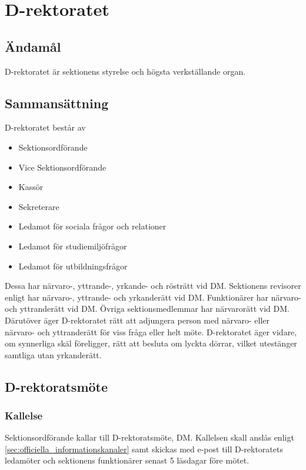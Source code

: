 \documentclass[a4paper,12pt]{article}
\begin{document}
\section{D-rektoratet}

\subsection{Ändamål}

D-rektoratet är sektionens styrelse och högsta verkställande organ.

\subsection{Sammansättning}

D-rektoratet består av

\begin{itemize}
  \item Sektionsordförande
  \item Vice Sektionsordförande
  \item Kassör
  \item Sekreterare
  \item Ledamot för sociala frågor och relationer
  \item Ledamot för studiemiljöfrågor
  \item Ledamot för utbildningsfrågor
\end{itemize}

Dessa har närvaro-, yttrande-, yrkande- och rösträtt vid DM. Sektionens revisorer enligt har närvaro-, yttrande- och yrkanderätt vid DM. Funktionärer har närvaro- och yttranderätt vid DM. Övriga sektionsmedlemmar har närvarorätt vid DM. Därutöver äger D-rektoratet rätt att adjungera person med närvaro- eller närvaro- och yttranderätt för viss fråga eller helt möte. D-rektoratet äger vidare, om synnerliga skäl föreligger, rätt att besluta om lyckta dörrar, vilket utestänger samtliga utan yrkanderätt.

\subsection{D-rektoratsmöte}
\label{sec:d_rektoratsmote}

\subsubsection{Kallelse}

Sektionsordförande kallar till D-rektoratsmöte, DM. Kallelsen skall anslås enligt \ref{sec:officiella_informationskanaler} samt skickas med e-post till D-rektoratets ledamöter och sektionens funktionärer senast 5 läsdagar före mötet.
\end{document}
